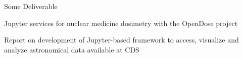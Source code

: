 \begin{workpackage}
\begin{wpdescription}
\end{wpdescription}

\begin{tasklist}
% 





\end{tasklist}



\begin{wpdelivs}
\begin{wpdeliv}[due=1,miles=startup,id=infrastructure,dissem=PU,nature=DEC,lead=SRL]
  {Some Deliverable}
\end{wpdeliv}
\begin{wpdeliv}[due=1,miles=startup,id=opendose-analysis,dissem=PU,nature=DEM,lead=INSERM]
  {Jupyter services for nuclear medicine dosimetry with the OpenDose project}
\end{wpdeliv}
\begin{wpdeliv}[due=1,miles=startup,id=application-astro,dissem=PU,nature=R,lead=CDS]
  {Report on development of Jupyter-based framework to access, visualize and analyze astronomical data available at CDS}
\end{wpdeliv}

\end{wpdelivs}
\end{workpackage}

